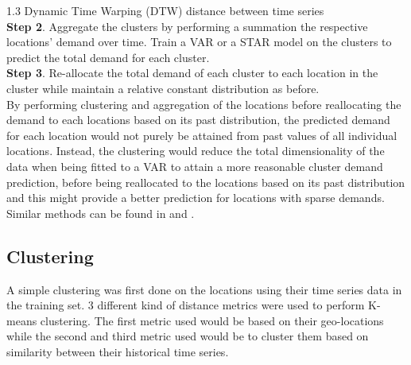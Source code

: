 \documentclass[nonblindrev,msom]{informs3} %
\begin{document}
	1.3 Dynamic Time Warping (DTW) distance between time series \\
	
	
	
\noindent \textbf{Step 2}. Aggregate the clusters by performing a summation the respective locations' demand over time. Train a VAR or a STAR model on the clusters to predict the total demand for each cluster. \\

\noindent \textbf{Step 3}. Re-allocate the total demand of each cluster to each location in the cluster while maintain a relative constant distribution as before. \\







\noindent By performing clustering and aggregation of the locations before reallocating the demand to each locations based on its past distribution, the predicted demand for each location would not purely be attained from past values of all individual locations. Instead, the clustering would reduce the total dimensionality of the data when being fitted to a VAR to attain a more reasonable cluster demand prediction, before being reallocated to the locations based on its past distribution and this might provide a better prediction for locations with sparse demands. Similar methods can be found in \cite{Paul2015} and \cite{Chi2014}.

\noindent 
\subsection{Clustering}

A simple clustering was first done on the locations using their time series data in the training set. 3 different kind of distance metrics were used to perform K-means clustering. The first metric used would be based on their geo-locations while the second and third metric used would be to cluster them based on similarity between their historical time series. 
\end{document}
